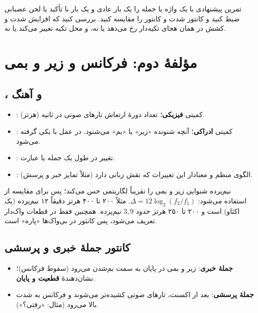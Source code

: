\begin{assignmentbox}{تمرین پیشنهادی با }
یک واژه یا جمله را یک بار عادی و یک بار با تأکید یا لحن عصبانی ضبط کنید و کانتور شدت و کانتور  را مقایسه کنید. بررسی کنید که افزایش شدت و کشش در همان هجای تکیه‌دار رخ می‌دهد یا نه، و محل تکیه تغییر می‌کند یا نه.
\end{assignmentbox}

\section{مؤلفهٔ دوم: فرکانس و زیر و بمی}

\subsection{،  و آهنگ}
\begin{itemize}
  \item {}: کمیتی \textbf{فیزیکی}؛ تعداد دورهٔ ارتعاش تارهای صوتی در ثانیه (هرتز).
  \item {}: کمیتی \textbf{ادراکی}؛ آنچه شنونده «زیر» یا «بم» می‌شنود. در عمل با  یکی گرفته می‌شود.
  \item {}: تغییر  در طول یک جمله یا عبارت.
  \item {}: الگوی منظم و معنادار این تغییرات که نقش زبانی دارد (مثلاً تمایز خبر و پرسش).
\end{itemize}

\begin{addedbox}{نیم‌پرده}
شنوایی زیر و بمی را تقریباً لگاریتمی حس می‌کند؛ پس برای مقایسه از  استفاده می‌شود: $\Delta=12\log_2(f_2/f_1)$. مثلاً ۲۰۰ تا ۴۰۰ هرتز دقیقاً ۱۲ نیم‌پرده (یک اکتاو) است و ۲۰۰ تا ۲۵۰ هرتز حدود $3{,}9$ نیم‌پرده. همچنین  فقط در قطعات واک‌دار تعریف می‌شود، پس کانتور در بی‌واک‌ها «پاره» است.
\end{addedbox}

\subsection{کانتور جملهٔ خبری و پرسشی}
\begin{itemize}
  \item \textbf{جملهٔ خبری}: زیر و بمی در پایان به سمت بم‌شدن می‌رود (سقوط فرکانس)؛ نشان‌دهندهٔ \textbf{قطعیت و پایان}.
  \item \textbf{جملهٔ پرسشی}: بعد از اکسنت، تارهای صوتی کشیده‌تر می‌شوند و فرکانس به شدت بالا می‌رود (مثال: «رفتی؟»).
\end{itemize}

